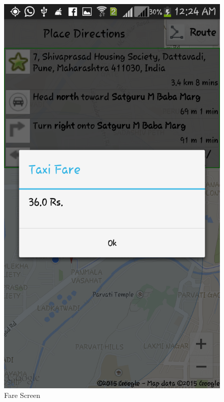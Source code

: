 \documentclass[12pt,a4paper]{article}
\begin{document}
\begin{figure}[!htb]
\includegraphics[width=12 cm]{fare}
\caption{Fare Screen}
\end{figure}
\\
\end{document}
